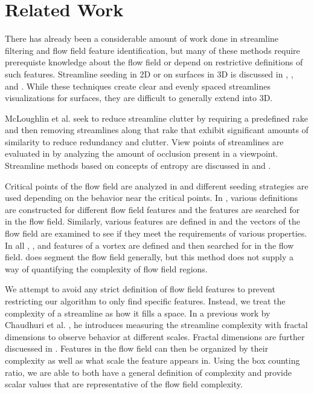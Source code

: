 \documentclass{egpubl}
\begin{document}
\section{Related Work}

There has already been a considerable amount of work done in streamline filtering and flow field feature identification, but many of these methods require prerequiste knowledge about the flow field or depend on restrictive definitions of such features.
Streamline seeding in 2D or on surfaces in 3D is discussed in \cite{turk}, \cite{mao}, and \cite{mebarki}.
While these techniques create clear and evenly spaced streamlines visualizations for surfaces, they are difficult to generally extend into 3D.

McLoughlin et al. \cite{mcloughlin} seek to reduce streamline clutter by requiring a predefined rake and then removing streamlines along that rake that exhibit significant amounts of similarity to reduce redundancy and clutter.
View points of streamlines are evaluated in \cite{marchesin} by analyzing the amount of occlusion present in a viewpoint.
Streamline methods based on concepts of entropy are discussed in \cite{shen} and \cite{lee}.

Critical points of the flow field are analyzed in \cite{ye} and different seeding strategies are used depending on the behavior near the critical points.
In \cite{salzbrunn}, various definitions are constructed for different flow field features and the features are searched for in the flow field.
Similarly, various features are defined in \cite{heiberg} and the vectors of the flow field are examined to see if they meet the requirements of various properties.
In all \cite{sadarjoen1999}, \cite{sadarjoen1998}, and \cite{zhong} features of a vortex are defined and then searched for in the flow field.
\cite{mahrous} does segment the flow field generally, but this method does not supply a way of quantifying the complexity of flow field regions.

We attempt to avoid any strict definition of flow field features to prevent restricting our algorithm to only find specific features.
Instead, we treat the complexity of a streamline as how it fills a space.
In a previous work by Chaudhuri et al. \cite{chaudhuri}, he introduces measuring the streamline complexity with fractal dimensions to observe behavior at different scales.
Fractal dimensions are further discuessed in \cite{khoury}.
Features in the flow field can then be organized by their complexity as well as what scale the feature appears in.
Using the box counting ratio, we are able to both have a general definition of complexity and provide scalar values that are representative of the flow field complexity.
\end{document}
